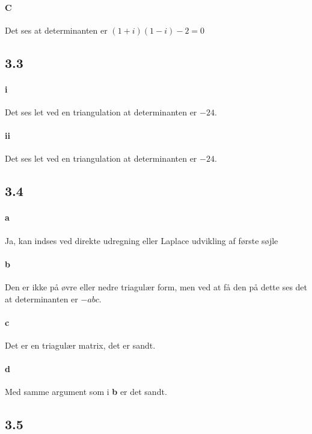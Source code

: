 			\paragraph{C} Det ses at determinanten er $(1+i)(1-i)-2=0$

		\subsection{3.3}

			\paragraph{i} Det ses let ved en triangulation at determinanten er $-24$.

			\paragraph{ii} Det ses let ved en triangulation at determinanten er $-24$.

		\subsection{3.4}

			\paragraph{a} Ja, kan indses ved direkte udregning eller Laplace udvikling af første søjle

			\paragraph{b} Den er ikke på øvre eller nedre triagulær form, men ved at få den på dette ses det at determinanten er $-abc$.

			\paragraph{c} Det er en triagulær matrix, det er sandt.

			\paragraph{d} Med samme argument som i \textbf{b} er det sandt. 

		\subsection{3.5}

